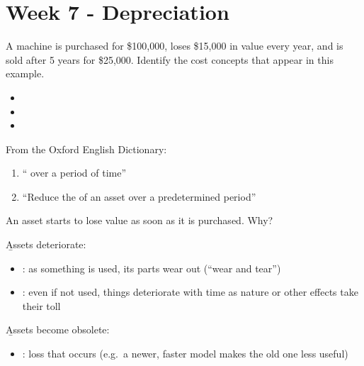 
\section{Week 7 - Depreciation}


\begin{example}
    A machine is purchased for \$100,000, loses \$15,000 in value every year,
    and is sold after 5 years for \$25,000. Identify the cost concepts that
    appear in this example.
    \begin{itemize}
        \item {}
        \item {}
        \item {}
    \end{itemize}
\end{example}

\begin{definition}[Depreciation]
    From the Oxford English Dictionary:
    \begin{enumerate}
        \item `` over a period of time''
        \item ``Reduce the  of an asset over a predetermined period''
    \end{enumerate}
\end{definition}

\begin{example}
    An asset starts to lose value as soon as it is purchased. Why?
    \\
\end{example}

\b{Assets deteriorate}:
\begin{itemize}
    \item {}: as something is used, its parts wear out (``wear and tear'')
    \item {}: even if not used, things deteriorate with time as nature or other effects take their toll
\end{itemize}
\b{Assets become obsolete}:
\begin{itemize}
    \item {}: loss that occurs  (e.g.\ a newer, faster model makes the old one less useful)
\end{itemize}

